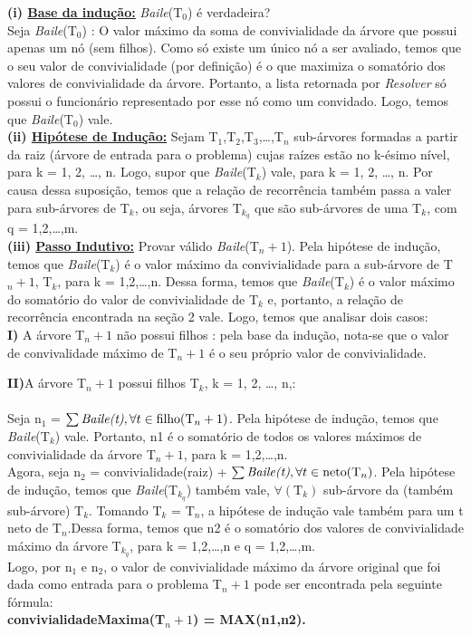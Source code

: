 \documentclass[a4paper]{article}
\begin{document}
\textbf{(i) \underline{Base da indução:}} \emph{Baile}(T$_{0}$) é verdadeira?\\
\qquad Seja \emph{Baile}(T$_0$) : O valor máximo da soma de convivialidade da árvore que possui apenas um nó (sem filhos). Como só existe um único nó a ser avaliado, temos que o seu valor de convivialidade (por definição) é o que maximiza o somatório dos valores de convivialidade da árvore. Portanto, a lista retornada por \emph{Resolver} só possui o funcionário representado por esse nó como um convidado. Logo, temos que \emph{Baile}(T$_{0}$) vale.\\

\textbf{(ii) \underline{Hipótese de Indução:}} Sejam  T$_{1}$,T$_{2}$,T$_{3}$,\ldots,T$_{n}$ sub-árvores formadas a partir da raiz (árvore de entrada para o problema) cujas raízes estão no k-ésimo nível, para k = 1, 2, \ldots, n. Logo, supor que \emph{Baile}(T$_k$) vale, para k = 1, 2, \ldots, n. Por causa dessa suposição, temos que a relação de recorrência também passa a valer para sub-árvores de T$_k$, ou seja, árvores T$_{k_q}$ que são sub-árvores de uma T$_k$, com q = 1,2,\ldots,m.\\

\textbf{(iii) \underline{Passo Indutivo:}} Provar válido  \emph{Baile}(T$_n+1$). Pela hipótese de indução, temos que \emph{Baile}(T$_k$) é o valor máximo da convivialidade para a sub-árvore de T$_n+1$, T$_k$, para k = 1,2,\ldots,n. Dessa forma, temos que \emph{Baile}(T$_k$) é o valor máximo do somatório do valor de convivialidade de T$_k$ e, portanto, a relação de recorrência encontrada na seção 2 vale. Logo, temos que analisar dois casos:\\

\textbf{I)} A árvore T$_n+1$ não possui filhos : pela base da indução, nota-se que o valor de convivalidade máximo de T$_n+1$ é o seu próprio valor de convivialidade.

\textbf{II)}A árvore T$_n+1$ possui filhos T$_k$, k = 1, 2, \ldots, n,:
\paragraph{}Seja n$_1$ = $\sum \text{\emph{Baile(t)}}, \forall t \in \text{filho(T$_n+1$)}$. Pela hipótese de indução, temos que \emph{Baile}(T$_k$) vale. Portanto, n1 é o somatório de todos os valores máximos de convivialidade da árvore T$_n+1$, para k = 1,2,\ldots,n.\\
Agora, seja n$_2$ = convivialidade(raiz) + $\sum \text{\emph{Baile(t)}}, \forall t \in \text{neto(T$_n$)}$. Pela hipótese de indução, temos que \emph{Baile}(T$_{k_q}$) também vale, $\forall(\text{T}_k)$  sub-árvore da (também sub-árvore) T$_k$. Tomando T$_k$ = T$_n$, a hipótese de indução vale também para um t neto de T$_n$.Dessa forma, temos que n2 é o somatório dos valores de convivialidade máximo da árvore T$_{k_q}$, para k = 1,2,\ldots,n e q = 1,2,\ldots,m.\\
Logo, por n$_1$ e n$_2$, o valor de convivialidade máximo da árvore original que foi dada como entrada para o problema T$_n+1$  pode ser encontrada pela seguinte fórmula:\\
\center \textbf{convivialidadeMaxima(T$_n+1$) =  MAX(n1,n2).}\\
\end{document}
